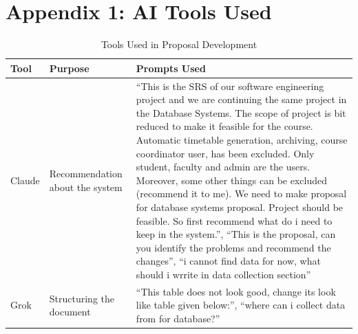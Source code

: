 \documentclass[12pt, a4paper]{report}
\begin{document}
\appendix
\section*{Appendix 1: AI Tools Used}

\vspace{0.5em}
\begin{table}[H]
\centering
\small
\begin{tabular}{p{3.2cm} p{5.0cm} p{7.5cm}}
\toprule
\textbf{Tool} & \textbf{Purpose} & \textbf{Prompts Used} \\
\midrule
Claude & 
Recommendation about the system &
``This is the SRS of our software engineering project and we are continuing the same project in the Database Systems. The scope of project is bit reduced to make it feasible for the course. Automatic timetable generation, archiving, course coordinator user,  has been excluded. Only student, faculty and admin are the users. Moreover, some other things can be excluded (recommend it to me). We need to make proposal for database systems proposal. Project should be feasible. So first recommend what do i need to keep in the system.'', ``This is the proposal, can you identify the problems and recommend the changes'', ``i cannot find data for now, what should i wrrite in data collection section''\\
\addlinespace
Grok & 
Structuring the document &
``This table does not look good, change its look like table given below:'', ``where can i collect data from for database?''\\
\bottomrule
\end{tabular}
\caption{Tools Used in Proposal Development}
\label{tab:tools-used}
\end{table}
\end{document}
